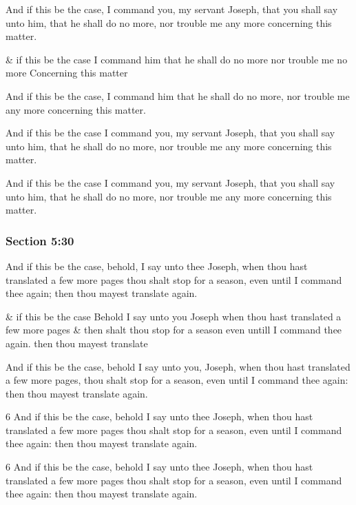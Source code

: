 		And if this be the case, I command you, my servant Joseph, that you shall say unto him, that he shall do no more, nor trouble me any more concerning this matter.

		\begin{framed}
		\scriptsize
			\begin{compactdesc}
				\item[JSP] \& if this be the case I command him that he shall do no more nor trouble me no more Concerning this matter
				\item[RB1] [\textit{missing}]
				\item[BC] And if this be the case, I command him that he shall do no more, nor trouble me any more concerning this matter.
				\item[DC 1835] And if this be the case I command you, my servant Joseph, that you shall say unto him, that he shall do no more, nor trouble me any more concerning this matter.
				\item[DC 1844] And if this be the case I command you, my servant Joseph, that you shall say unto him, that he shall do no more, nor trouble me any more concerning this matter.
			\end{compactdesc}
		\end{framed}

	\subsubsection{Section 5:30} %
		\label{DC5-30}

		And if this be the case, behold, I say unto thee Joseph, when thou hast translated a few more pages thou shalt stop for a season, even until I command thee again; then thou mayest translate again.

		\begin{framed}
		\scriptsize
			\begin{compactdesc}
				\item[JSP] \& if this be the case Behold I say unto you Joseph when thou hast translated a few more pages \& then shalt thou stop for a season even untill I command thee again. then thou mayest translate
				\item[RB1] [\textit{missing}]
				\item[BC] And if this be the case, behold I say unto you, Joseph, when thou hast translated a few more pages, thou shalt stop for a season, even until I command thee again: then thou mayest translate again.
				\item[DC 1835] 6 And if this be the case, behold I say unto thee Joseph, when thou hast translated a few more pages thou shalt stop for a season, even until I command thee again: then thou mayest translate again.
				\item[DC 1844] 6 And if this be the case, behold I say unto thee Joseph, when thou hast translated a few more pages thou shalt stop for a season, even until I command thee again: then thou mayest translate again.
			\end{compactdesc}
		\end{framed}

